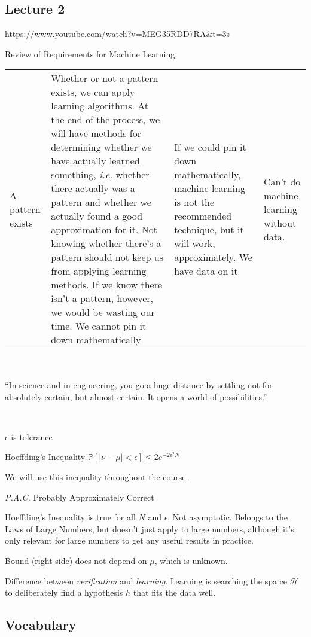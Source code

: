 \documentclass[11pt]{article}
\begin{document}
\begin{spacing}{1.2}
\section{Lecture 2}

\url{https://www.youtube.com/watch?v=MEG35RDD7RA&t=3s}

Review of Requirements for Machine Learning

\begin{tabular}{p{1.5in}p{4in}}
	A pattern exists & Whether or not a pattern exists, we can apply learning algorithms.  At the end of the process, we will have methods for determining whether we have actually learned something, {\it i.e.} whether there actually was a pattern and whether we actually found a good approximation for it. Not knowing whether there's a pattern should not keep us from applying learning methods.  If we know there isn't a pattern, however, we would be wasting our time.  \cr
	We cannot pin it down mathematically & If we could pin it down mathematically,  machine learning is not the recommended technique, but it will work, approximately.   \cr
	We have data on it &  Can't do machine learning without data. \cr
\end{tabular}

\

``In science and in engineering, you go a huge distance by settling not for absolutely certain, but almost certain.  It opens a world of possibilities.''

\

$\epsilon$ is tolerance

Hoeffding's Inequality
\hfil
$\mathbb{P}[|\nu - \mu| < \epsilon] \le 2e^{-2\epsilon^2 N} $

We will use this inequality throughout the course. 

{\it P.A.C.} Probably Approximately Correct

Hoeffding's Inequality is true for all $N$ and $\epsilon$.  Not asymptotic.  Belongs to the Laws of Large Numbers, but doesn't just apply to large numbers, although it's only relevant for large numbers to get any useful results in practice.  

Bound (right side) does not depend on $\mu$, which is unknown.  

Difference between {\it verification} and {\it learning}.  Learning is searching the spa ce $\mathcal{H}$ to deliberately find a hypothesis $h$ that fits the data well.  

\subsection{Vocabulary}


\end{spacing}
\end{document}
